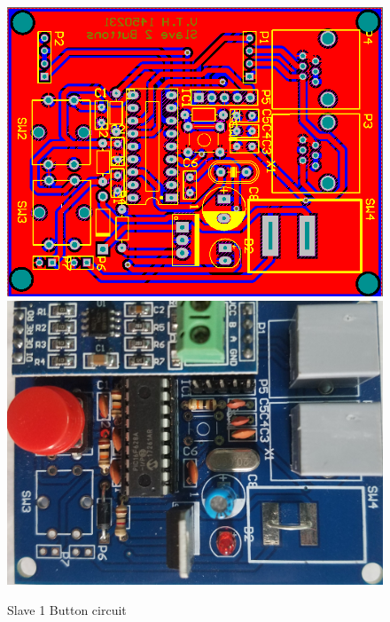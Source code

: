 \begin{figure}[!htbp]
    \begin{center}
    \includegraphics[scale=0.6]{images/s2bLayout.png}\\

    \includegraphics[scale=0.13]{images/s1b.jpg}
    \caption{Slave 1 Button circuit}
    \label{fig:slave1ButtonCircuit}
    \end{center}
\end{figure}
